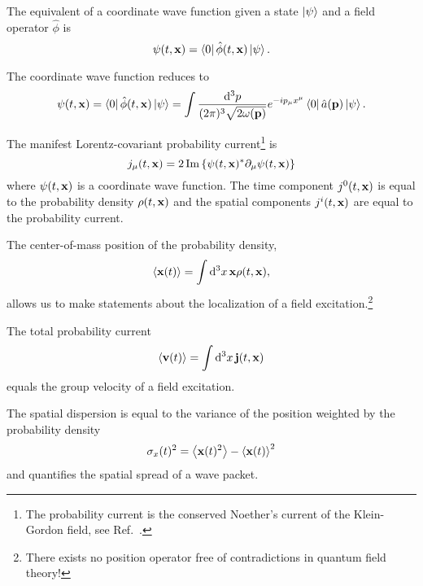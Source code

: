 \begin{definition}
	The equivalent of a coordinate wave function given a state $\ket{\psi}$ and a field operator $\hat\phi$ is
	\begin{equation}
		\psi(t,\vb{x})
		=
		\bra{0}\hat\phi(t,\vb{x})\ket{\psi}
		.
	\end{equation}
\end{definition}
\begin{lemma}\label{thm:coordinate_wave_function_simplified}
	The coordinate wave function reduces to
	\begin{equation}
		\psi(t,\vb{x})
		=
		\bra{0}\hat\phi(t,\vb{x})\ket{\psi}
		=
		\int\frac{\dd[3]{p}}{(2\pi)^3\sqrt{2\omega(\vb{p})}}
		e^{-ip_\mu x^\mu}
		\bra{0}
		\hat{a}(\vb{p})
		\ket{\psi}
		.
	\end{equation}
\end{lemma}
\begin{definition}
	The manifest Lorentz-covariant probability current\footnote{The probability current is the conserved Noether's current of the Klein-Gordon field, see Ref.~\cite[p.~18]{Peskin1995}.} is
	\begin{equation}
		j_\mu(t,\vb{x})
		=
		2
		\operatorname{\operatorname{Im}}\left\{
			\psi(t,\vb{x})^*
			\partial_\mu
			\psi(t,\vb{x})
		\right\}
		\label{eq:qkg_probability_current}
	\end{equation}
	where $\psi(t,\vb{x})$ is a coordinate wave function.
	The time component $j^0(t,\vb{x})$ is equal to the probability density $\rho(t,\vb{x})$ and the spatial components $j^i(t,\vb{x})$ are equal to the probability current.
\end{definition}
\begin{definition}[Localization]
	The center-of-mass position of the probability density,
	\begin{equation}
		\expval{\vb{x}(t)}
		=
		\int\dd[3]{x}
		\vb{x}
		\rho(t,\vb{x})
		,
	\end{equation}
	allows us to make statements about the localization of a field excitation.\footnote{There exists no position operator free of contradictions in quantum field theory!}
\end{definition}
\begin{definition}
	The total probability current
	\begin{equation}
		\expval{\vb{v}(t)}
		=
		\int\dd[3]{x}
		\vb{j}(t,\vb{x})
		\label{eq:group_velocity}
	\end{equation}
	equals the group velocity of a field excitation.
\end{definition}
\begin{definition}
	The spatial dispersion is equal to the variance of the position weighted by the probability density
	\begin{equation}
		\sigma_x(t)^2
		=
		\expval{\vb{x}(t)^2}
		-
		\expval{\vb{x}(t)}^2
	\end{equation}
	and quantifies the spatial spread of a wave packet.
\end{definition}